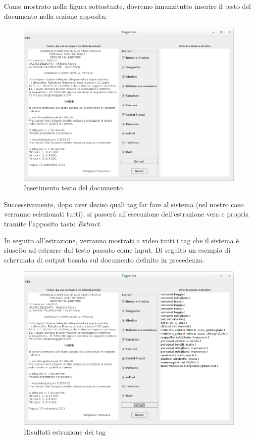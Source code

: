 Come mostrato nella figura sottostante, dovremo innanzitutto inserire il testo del documento nella sezione apposita:
\begin{figure}[H]
	\centering
	\includegraphics[width=1.1\textwidth]{img/interfaces/java-document.png}
	\caption[Schermata Java document]{Inserimento testo del documento}
	\label{java-doc}
\end{figure}

Successivamente, dopo aver deciso quali tag far fare al sistema (nel nostro caso verranno selezionati tutti), si passerà all'esecuzione dell'estrazione vera e propria tramite l'apposito tasto \emph{Extract}.

In seguito all'estrazione, verranno mostrati a video tutti i tag che il sistema è riuscito ad estrarre dal testo passato come input. Di seguito un esempio di schermata di output basata sul documento definito in precedenza.

\begin{figure}[H]
	\centering
	\includegraphics[width=1.1\textwidth]{img/interfaces/java-result.png}
	\caption[Schermata Java result]{Risultati estrazione dei tag}
	\label{java-result}
\end{figure}

